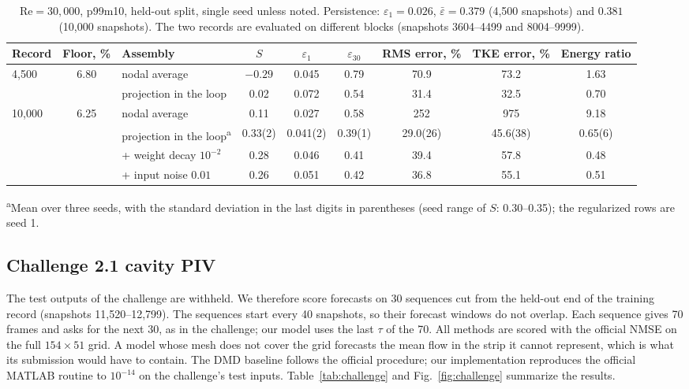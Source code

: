 \documentclass[conf]{new-aiaa}
\newcommand{\Rey}{\mathrm{Re}}
\begin{document}
\begin{table}[!tbp]
  \centering
  \small
  \setlength{\tabcolsep}{4pt}
  \caption{$\Rey=30{,}000$, p99m10, held-out split, single seed unless noted. Persistence: $\varepsilon_1=0.026$, $\bar\varepsilon=0.379$ (4,500 snapshots) and $0.381$ (10,000 snapshots). The two records are evaluated on different blocks (snapshots 3604--4499 and 8004--9999).}
  \label{tab:re30k}
  \begin{tabular}{lcl cccccc}
    \toprule
    Record & Floor, \% & Assembly & $S$ & $\varepsilon_{1}$ & $\varepsilon_{30}$ & RMS error, \% & TKE error, \% & Energy ratio \\
    \midrule
    \multirow{2}{*}{4,500} & \multirow{2}{*}{6.80} & nodal average & $-0.29$ & 0.045 & 0.79 & 70.9 & 73.2 & 1.63 \\
     & & projection in the loop & 0.02 & 0.072 & 0.54 & 31.4 & 32.5 & 0.70 \\
    \midrule
    \multirow{4}{*}{10,000} & \multirow{4}{*}{6.25} & nodal average & 0.11 & 0.027 & 0.58 & 252 & 975 & 9.18 \\
     & & projection in the loop\textsuperscript{a} & 0.33(2) & 0.041(2) & 0.39(1) & 29.0(26) & 45.6(38) & 0.65(6) \\
     & & \quad + weight decay $10^{-2}$ & 0.28 & 0.046 & 0.41 & 39.4 & 57.8 & 0.48 \\
     & & \quad + input noise $0.01$ & 0.26 & 0.051 & 0.42 & 36.8 & 55.1 & 0.51 \\
    \bottomrule
  \end{tabular}

  \smallskip
  {\footnotesize \textsuperscript{a}Mean over three seeds, with the standard deviation in the last digits in parentheses (seed range of $S$: 0.30--0.35); the regularized rows are seed 1.}
\end{table}

\subsection{Challenge 2.1 cavity PIV}
\label{sec:res_challenge}
The test outputs of the challenge are withheld. We therefore score forecasts on 30 sequences cut from the held-out end of the training record (snapshots 11,520--12,799). The sequences start every 40 snapshots, so their forecast windows do not overlap. Each sequence gives 70 frames and asks for the next 30, as in the challenge; our model uses the last $\tau$ of the 70. All methods are scored with the official NMSE on the full $154\times51$ grid. A model whose mesh does not cover the grid forecasts the mean flow in the strip it cannot represent, which is what its submission would have to contain. The DMD baseline follows the official procedure; our implementation reproduces the official MATLAB routine to $10^{-14}$ on the challenge's test inputs. Table~\ref{tab:challenge} and Fig.~\ref{fig:challenge} summarize the results.
\end{document}
